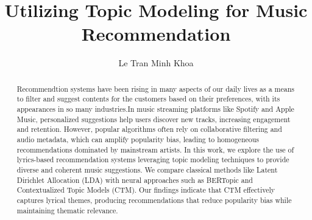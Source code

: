 \documentclass[12pt]{article}
\title{Utilizing Topic Modeling for Music Recommendation}
\author{Le Tran Minh Khoa}
\begin{document}
\maketitle

\begin{abstract}
    Recommendtion systems have been rising in many aspects of our daily lives as a means to filter and suggest contents for the customers based on their preferences, with its appearances in so many industries.In music streaming platforms like Spotify and Apple Music, personalized suggestions help users discover new tracks, increasing engagement and retention. However, popular algorithms often rely on collaborative filtering and audio metadata, which can amplify popularity bias, leading to homogeneous recommendations dominated by mainstream artists. In this work, we explore the use of lyrics-based recommendation systems leveraging topic modeling techniques to provide diverse and coherent music suggestions. We compare classical methods like Latent Dirichlet Allocation (LDA) with neural approaches such as BERTopic and Contextualized Topic Models (CTM). Our findings indicate that CTM effectively captures lyrical themes, producing recommendations that reduce popularity bias while maintaining thematic relevance.
\end{abstract}
\end{document}
